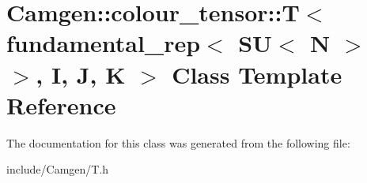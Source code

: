 \hypertarget{a00522}{\section{Camgen\-:\-:colour\-\_\-tensor\-:\-:T$<$ fundamental\-\_\-rep$<$ S\-U$<$ N $>$ $>$, I, J, K $>$ Class Template Reference}
\label{a00522}
}


The documentation for this class was generated from the following file\-:\begin{DoxyCompactItemize}
\item 
include/\-Camgen/T.\-h\end{DoxyCompactItemize}
